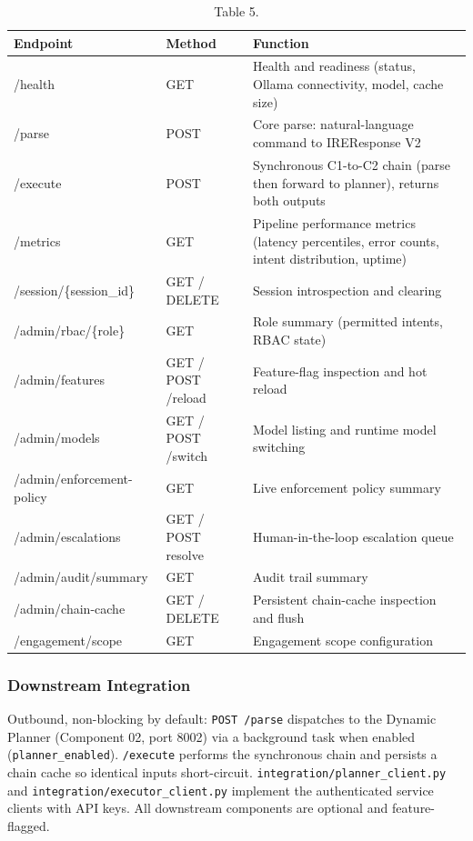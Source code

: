\documentclass[10pt,journal,onecolumn]{IEEEtran}
\begin{document}
\begin{table}[h]
\caption{Table 5.}
\label{tab:t5}
\begin{tabularx}{\columnwidth}{l >{\raggedright\arraybackslash}X >{\raggedright\arraybackslash}X}
\toprule
\textbf{Endpoint} & \textbf{Method} & \textbf{Function}\\
\midrule
/health & GET & Health and readiness (status, Ollama connectivity, model, cache size)\\
/parse & POST & Core parse: natural-language command to IREResponse V2\\
/execute & POST & Synchronous C1-to-C2 chain (parse then forward to planner), returns both outputs\\
/metrics & GET & Pipeline performance metrics (latency percentiles, error counts, intent distribution, uptime)\\
/session/\{session\_id\} & GET / DELETE & Session introspection and clearing\\
/admin/rbac/\{role\} & GET & Role summary (permitted intents, RBAC state)\\
/admin/features & GET / POST /reload & Feature-flag inspection and hot reload\\
/admin/models & GET / POST /switch & Model listing and runtime model switching\\
/admin/enforcement-policy & GET & Live enforcement policy summary\\
/admin/escalations & GET / POST resolve & Human-in-the-loop escalation queue\\
/admin/audit/summary & GET & Audit trail summary\\
/admin/chain-cache & GET / DELETE & Persistent chain-cache inspection and flush\\
/engagement/scope & GET & Engagement scope configuration\\
\bottomrule
\end{tabularx}
\end{table}

\subsubsection{Downstream Integration}

Outbound, non-blocking by default: \texttt{POST /parse} dispatches to the Dynamic Planner (Component 02, port 8002) via a background task when enabled (\texttt{planner\_enabled}). \texttt{/execute} performs the synchronous chain and persists a chain cache so identical inputs short-circuit. \texttt{integration/\allowbreak planner\_\allowbreak client.\allowbreak py} and \texttt{integration/\allowbreak executor\_\allowbreak client.\allowbreak py} implement the authenticated service clients with API keys. All downstream components are optional and feature-flagged.
\end{document}
